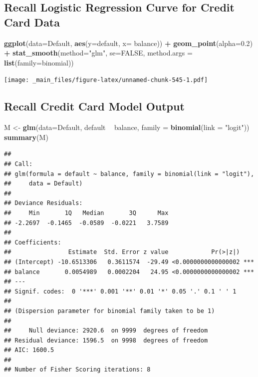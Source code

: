 \documentclass[]{book}
\newenvironment{Shaded}{\begin{snugshade}}{\end{snugshade}}
\newcommand{\KeywordTok}[1]{\textcolor[rgb]{0.13,0.29,0.53}{\textbf{#1}}}
\newcommand{\DataTypeTok}[1]{\textcolor[rgb]{0.13,0.29,0.53}{#1}}
\newcommand{\FloatTok}[1]{\textcolor[rgb]{0.00,0.00,0.81}{#1}}
\newcommand{\StringTok}[1]{\textcolor[rgb]{0.31,0.60,0.02}{#1}}
\newcommand{\OtherTok}[1]{\textcolor[rgb]{0.56,0.35,0.01}{#1}}
\newcommand{\OperatorTok}[1]{\textcolor[rgb]{0.81,0.36,0.00}{\textbf{#1}}}
\newcommand{\NormalTok}[1]{#1}
\begin{document}
\subsection{Recall Logistic Regression Curve for Credit Card
Data}\label{recall-logistic-regression-curve-for-credit-card-data}

\begin{Shaded}
\begin{Highlighting}[]
\KeywordTok{ggplot}\NormalTok{(}\DataTypeTok{data=}\NormalTok{Default, }\KeywordTok{aes}\NormalTok{(}\DataTypeTok{y=}\NormalTok{default, }\DataTypeTok{x=}\NormalTok{ balance)) }\OperatorTok{+}\StringTok{ }\KeywordTok{geom_point}\NormalTok{(}\DataTypeTok{alpha=}\FloatTok{0.2}\NormalTok{) }\OperatorTok{+}\StringTok{ }
\StringTok{  }\KeywordTok{stat_smooth}\NormalTok{(}\DataTypeTok{method=}\StringTok{"glm"}\NormalTok{, }\DataTypeTok{se=}\OtherTok{FALSE}\NormalTok{, }\DataTypeTok{method.args =} \KeywordTok{list}\NormalTok{(}\DataTypeTok{family=}\NormalTok{binomial)) }
\end{Highlighting}
\end{Shaded}

\texttt{[image: \_main\_files/figure-latex/unnamed-chunk-545-1.pdf]}

\subsection{Recall Credit Card Model
Output}\label{recall-credit-card-model-output}

\begin{Shaded}
\begin{Highlighting}[]
\NormalTok{M <-}\StringTok{ }\KeywordTok{glm}\NormalTok{(}\DataTypeTok{data=}\NormalTok{Default, default }\OperatorTok{~}\StringTok{ }\NormalTok{balance, }\DataTypeTok{family =} \KeywordTok{binomial}\NormalTok{(}\DataTypeTok{link =} \StringTok{"logit"}\NormalTok{))}
\KeywordTok{summary}\NormalTok{(M)}
\end{Highlighting}
\end{Shaded}

\begin{verbatim}
## 
## Call:
## glm(formula = default ~ balance, family = binomial(link = "logit"), 
##     data = Default)
## 
## Deviance Residuals: 
##     Min       1Q   Median       3Q      Max  
## -2.2697  -0.1465  -0.0589  -0.0221   3.7589  
## 
## Coefficients:
##                Estimate  Std. Error z value            Pr(>|z|)    
## (Intercept) -10.6513306   0.3611574  -29.49 <0.0000000000000002 ***
## balance       0.0054989   0.0002204   24.95 <0.0000000000000002 ***
## ---
## Signif. codes:  0 '***' 0.001 '**' 0.01 '*' 0.05 '.' 0.1 ' ' 1
## 
## (Dispersion parameter for binomial family taken to be 1)
## 
##     Null deviance: 2920.6  on 9999  degrees of freedom
## Residual deviance: 1596.5  on 9998  degrees of freedom
## AIC: 1600.5
## 
## Number of Fisher Scoring iterations: 8
\end{verbatim}
\end{document}
